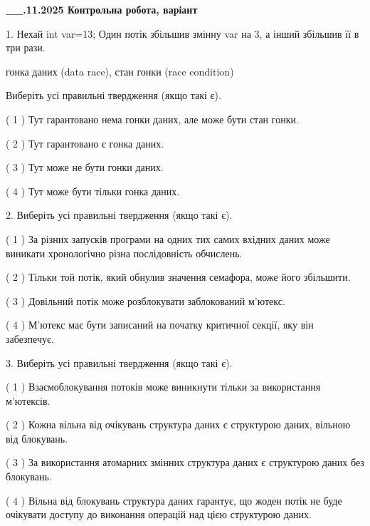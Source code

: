 \documentclass[12pt, ukrainian]{article}
\begin{document}
\newpage
\begin {large}

\textbf{\_\_.11.2025 Контрольна робота, варіант  }\par


{
1. Нехай int var=13; Один потік збільшив змінну var на 3, а інший збільшив її в три рази.

гонка даних (data race), стан гонки (race condition)

Виберіть усі правильні твердження (якщо такі є).\par
\vspace{2mm}
( 1 ) Тут гарантовано нема гонки даних, але може бути стан гонки.%

( 2 ) Тут гарантовано є гонка даних.%

( 3 ) Тут може не бути гонки даних.%

( 4 ) Тут може бути тільки гонка даних.%


2. Виберіть усі правильні твердження (якщо такі є).\par
\vspace{2mm}

( 1 ) За різних запусків програми на одних тих самих вхідних даних може виникати хронологічно різна послідовність обчислень.%

( 2 ) Тільки той потік, який обнулив значення семафора, може його збільшити.%

( 3 ) Довільний потік може розблокувати заблокований м’ютекс.%

( 4 ) М’ютекс має бути записаний на початку критичної секції, яку він забезпечує.%


3. Виберіть усі правильні твердження (якщо такі є).\par
\vspace{2mm}

( 1 ) Взаємоблокування потоків може виникнути тільки за використання м’ютексів.%

( 2 ) Кожна вільна від очікувань структура даних є структурою даних, вільною від блокувань.%

( 3 ) За використання атомарних змінних структура даних є структурою даних без блокувань.%

( 4 ) Вільна від блокувань структура даних гарантує, що жоден потік не буде очікувати доступу до виконання операцій над цією структурою даних.%


}
\end{large}
\end{document}
